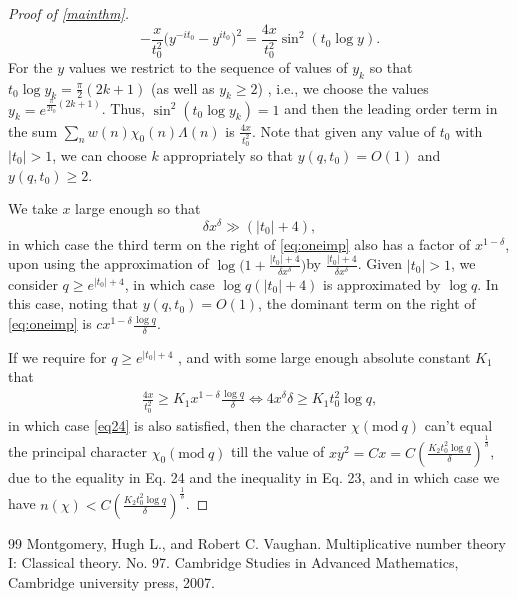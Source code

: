 \documentclass[10pt,a4paper]{amsart}
\begin{document}
\begin{proof}[Proof of \cref{mainthm}]
\begin{equation}\label{eq:last}
    -\frac{x}{t_{0}^{2}}\big(y^{-it_0} -y^{it_0}\big)^{2}=\frac{4x}{t_{0}^{2}}\sin^{2}(t_0 \log y).
\end{equation}
For the $y$ values we restrict to the sequence of values of $y_k$ so that $t_0 \log y_k =\frac{\pi}{2}(2k+1)$ (as well as $y_k\geq 2$) , i.e., we choose the values $y_k=e^{\frac{\pi}{2t_0}(2k+1)}$. Thus, $\sin^{2}(t_0 \log y_k)=1$ and then the leading order term in the sum $\sum\limits_{n}w(n)\chi_0(n)\Lambda(n)$ is $\frac{4x}{t_{0}^{2}}$.  Note that given any value of $t_0$ with $|t_0|>1$, we can choose $k$ appropriately so that $y(q,t_0)=O(1)$ and $y(q,t_0)\geq 2$.

We take $x$ large enough so that
\begin{equation}\label{eq24}
\delta x^{\delta}\gg (|t_0|+4),
\end{equation}
in which case the third term on the right of \cref{eq:oneimp} also has a factor of $x^{1-\delta}$, upon using the approximation of $\log\big(1+ \frac{|t_0|+4}{\delta x^{\delta}}\big)$by $ \frac{|t_0|+4}{\delta x^{\delta}} $. Given $|t_0|>1$, we consider $q\geq e^{|t_0|+4}$, in which case $\log q(|t_0|+4)$ is approximated by $ \log q$. In this case, noting that $y(q,t_0)=O(1)$, the dominant term on the right of \cref{eq:oneimp} is $c x^{1-\delta}\frac{\log q}{\delta}$.

If we require for $q\geq e^{|t_0|+4}$ , and with some large enough absolute constant $K_1$ that
\begin{align}
    \frac{4x}{t_{0}^{2}}\geq K_1 x^{1-\delta}\frac{\log q}{\delta}\Leftrightarrow 4x^{\delta}\delta \geq K_1 t_{0}^{2}\log q,
\end{align}
in which case \cref{eq24} is also satisfied, then the character $\chi(\text{mod} \ q)$ can't equal the principal character $\chi_0(\text{mod} \ q)$ till the value of $xy^{2}=Cx=C(\frac{K_2 t_{0}^{2}\log q}{\delta})^{\frac{1}{\delta}}$, due to the equality in Eq. 24 and the inequality in Eq. 23, and in which case we have $n(\chi)<C(\frac{K_2 t_{0}^{2}\log q}{\delta})^{\frac{1}{\delta}}$.
\end{proof}

\begin{thebibliography}{99}
 Montgomery, Hugh L., and Robert C. Vaughan. Multiplicative number theory I: Classical theory. No. 97. Cambridge Studies in Advanced Mathematics, Cambridge university press, 2007.
\end{thebibliography}
\end{document}
